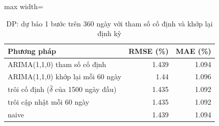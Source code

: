 \begin{table}[H]
\centering\small
\caption{DP: dự báo 1 bước trên 360 ngày với tham số cố định và khớp lại định kỳ}\label{tab:tab_b12_12_dp_rolling}
\begin{adjustbox}{max width=\linewidth}
\begin{tabular}{>{\raggedright\arraybackslash}p{}rr}
\toprule
Phương pháp & RMSE (\%) & MAE (\%) \\
\midrule
ARIMA(1,1,0) tham số cố định & 1.439 & 1.094 \\
ARIMA(1,1,0) khớp lại mỗi 60 ngày & 1.44 & 1.096 \\
trôi cố định ($\hat{\delta}$ của 1500 ngày đầu) & 1.435 & 1.092 \\
trôi cập nhật mỗi 60 ngày & 1.435 & 1.092 \\
naive & 1.439 & 1.094 \\
\bottomrule
\end{tabular}
\end{adjustbox}
\end{table}
